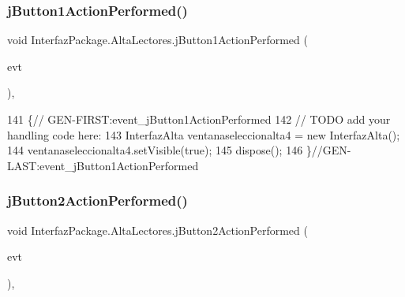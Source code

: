 \subsubsection{\texorpdfstring{j\+Button1\+Action\+Performed()}{jButton1ActionPerformed()}}
{\footnotesize\ttfamily void Interfaz\+Package.\+Alta\+Lectores.\+j\+Button1\+Action\+Performed (\begin{DoxyParamCaption}\item[{java.\+awt.\+event.\+Action\+Event}]{evt }\end{DoxyParamCaption})\hspace{0.3cm}{\ttfamily [inline]}, {\ttfamily [private]}}


\begin{DoxyCode}
141                                                                          \{\textcolor{comment}{//
      GEN-FIRST:event\_jButton1ActionPerformed}
142         \textcolor{comment}{// TODO add your handling code here:}
143         InterfazAlta ventanaseleccionalta4 = \textcolor{keyword}{new} InterfazAlta();
144         ventanaseleccionalta4.setVisible(\textcolor{keyword}{true});
145         dispose();
146     \}\textcolor{comment}{//GEN-LAST:event\_jButton1ActionPerformed}
\end{DoxyCode}
\mbox{\label{class_interfaz_package_1_1_alta_lectores_a15e953f7a9cd8a7448fdac22f39f55aa}} 
\subsubsection{\texorpdfstring{j\+Button2\+Action\+Performed()}{jButton2ActionPerformed()}}
{\footnotesize\ttfamily void Interfaz\+Package.\+Alta\+Lectores.\+j\+Button2\+Action\+Performed (\begin{DoxyParamCaption}\item[{java.\+awt.\+event.\+Action\+Event}]{evt }\end{DoxyParamCaption})\hspace{0.3cm}{\ttfamily [inline]}, {\ttfamily [private]}}



